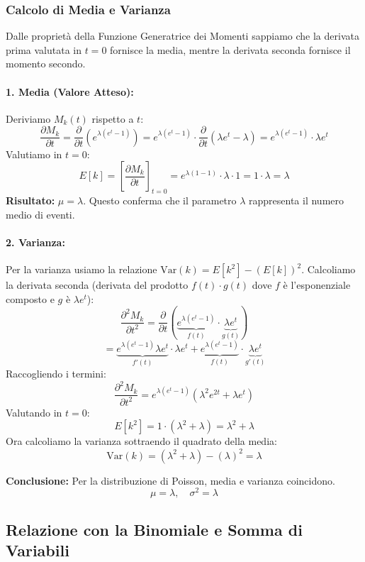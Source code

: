\documentclass[openany,a4paper,12pt]{book}
\theoremstyle{remark}
\begin{document}
\subsubsection*{Calcolo di Media e Varianza}
Dalle proprietà della Funzione Generatrice dei Momenti sappiamo che la derivata prima valutata in $t=0$ fornisce la media, mentre la derivata seconda fornisce il momento secondo.

\paragraph{1. Media (Valore Atteso):}
Deriviamo $M_k(t)$ rispetto a $t$:
\[
\frac{\partial M_k}{\partial t} = \frac{\partial}{\partial t} \left( e^{\lambda(e^t - 1)} \right) = e^{\lambda(e^t - 1)} \cdot \frac{\partial}{\partial t}(\lambda e^t - \lambda) = e^{\lambda(e^t - 1)} \cdot \lambda e^t
\]
Valutiamo in $t=0$:
\[
E[k] = \left[ \frac{\partial M_k}{\partial t} \right]_{t=0} = e^{\lambda(1-1)} \cdot \lambda \cdot 1 = 1 \cdot \lambda = \lambda
\]
\textbf{Risultato:} $\mu = \lambda$. Questo conferma che il parametro $\lambda$ rappresenta il numero medio di eventi.

\paragraph{2. Varianza:}
Per la varianza usiamo la relazione $\text{Var}(k) = E[k^2] - (E[k])^2$.
Calcoliamo la derivata seconda (derivata del prodotto $f(t) \cdot g(t)$ dove $f$ è l'esponenziale composto e $g$ è $\lambda e^t$):
\[
\frac{\partial^2 M_k}{\partial t^2} = \frac{\partial}{\partial t} \left( \underbrace{e^{\lambda(e^t - 1)}}_{f(t)} \cdot \underbrace{\lambda e^t}_{g(t)} \right)
\]
\[
= \underbrace{e^{\lambda(e^t - 1)} \lambda e^t}_{f'(t)} \cdot \lambda e^t + \underbrace{e^{\lambda(e^t - 1)}}_{f(t)} \cdot \underbrace{\lambda e^t}_{g'(t)}
\]
Raccogliendo i termini:
\[
\frac{\partial^2 M_k}{\partial t^2} = e^{\lambda(e^t - 1)} (\lambda^2 e^{2t} + \lambda e^t)
\]
Valutando in $t=0$:
\[
E[k^2] = 1 \cdot (\lambda^2 + \lambda) = \lambda^2 + \lambda
\]
Ora calcoliamo la varianza sottraendo il quadrato della media:
\[
\text{Var}(k) = (\lambda^2 + \lambda) - (\lambda)^2 = \lambda
\]

\textbf{Conclusione:} Per la distribuzione di Poisson, media e varianza coincidono.
\begin{equation}
\boxed{\mu = \lambda, \quad \sigma^2 = \lambda}
\end{equation}

\subsection*{Relazione con la Binomiale e Somma di Variabili}
\end{document}
